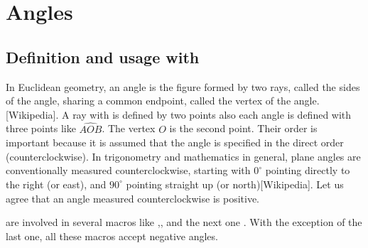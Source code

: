 \section{Angles} 
\subsection{Definition and usage with }
In Euclidean geometry, an angle is the figure formed by two rays, called the sides of the angle, sharing a common endpoint, called the vertex of the angle.[Wikipedia]. A ray with  is defined by two points also each angle is defined with three points like $\widehat{AOB}$. The vertex $O$ is the second point. Their order is important because it is assumed that the angle is specified in the direct order (counterclockwise). 
In trigonometry and mathematics in general, plane angles are conventionally measured counterclockwise, starting with $0^\circ$  pointing directly to the right (or east), and $90^\circ$ pointing straight up (or north)[Wikipedia]. 
Let us agree that an angle measured counterclockwise is positive.

  \begin{center}
  \end{center}
  
  are involved in several macros like ,, 
 and the next one  . With the exception of the last one, all these macros accept negative angles.
 
